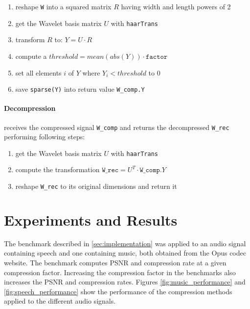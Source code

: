\documentclass[a4paper]{scrartcl}
\begin{document}
\begin{enumerate}

\item reshape \texttt{W} into a squared matrix $R$ having width and length
powers of 2

\item get the Wavelet basis matrix $U$ with \texttt{haarTrans}

\item transform $R$ to: $Y = U \cdot R$

\item compute a $threshold = mean(abs(Y)) \cdot \texttt{factor}$

\item set all elements $i$ of $Y$ where $Y_i < threshold$ to $0$

\item save \texttt{sparse(Y)} into return value \texttt{W\_comp.Y}


\end{enumerate}


\paragraph{Decompression} receives the compressed signal \texttt{W\_comp} and
returns the decompressed \texttt{W\_rec} performing following steps:

\begin{enumerate}

\item get the Wavelet basis matrix $U$ with \texttt{haarTrans}

\item compute the transformation $\texttt{W\_rec} = U^T \cdot
\texttt{W\_comp}.Y$

\item reshape \texttt{W\_rec} to its original dimensions and return it

\end{enumerate}

\newpage
\section{Experiments and Results}

The benchmark described in \autoref{sec:implementation} was applied to an audio
signal containing speech and one containing music, both obtained from the Opus
codec website. The benchmark computes PSNR and compression rate at a given
compression factor. Increasing the compression factor in the benchmarks also
increases the PSNR and compression rates. Figures \ref{fig:music_performance}
and \ref{fig:speech_performance} show the performance of the compression methods
applied to the different audio signals.
\end{document}
